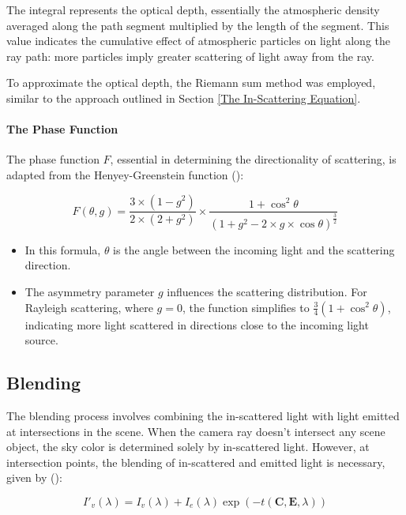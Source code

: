 The integral represents the optical depth, essentially the atmospheric density averaged along the path segment multiplied by the length of the segment. This value indicates the cumulative effect of atmospheric particles on light along the ray path: more particles imply greater scattering of light away from the ray.

To approximate the optical depth, the Riemann sum method was employed, similar to the approach outlined in Section \ref{The In-Scattering Equation}.

\paragraph{The Phase Function}

The phase function $F$, essential in determining the directionality of scattering, is adapted from the Henyey-Greenstein function ():

\begin{equation}
    F(\theta, g) = \frac{3 \times (1 - g^2)}{2 \times (2 + g^2)} \times \frac{1 + \cos^2 \theta}{(1 + g^2 - 2 \times g \times \cos \theta)^{\frac{3}{2}}}
\end{equation}

\begin{itemize}
    \item In this formula, $\theta$ is the angle between the incoming light and the scattering direction.
    \item The asymmetry parameter $g$ influences the scattering distribution. For Rayleigh scattering, where $g = 0$, the function simplifies to $\frac{3}{4}(1 + \cos^2\theta)$, indicating more light scattered in directions close to the incoming light source.
\end{itemize}

\subsection{Blending}

The blending process involves combining the in-scattered light with light emitted at intersections in the scene. When the camera ray doesn't intersect any scene object, the sky color is determined solely by in-scattered light. However, at intersection points, the blending of in-scattered and emitted light is necessary, given by ():

\begin{equation}
    I'_v(\lambda) = I_v(\lambda) + I_e(\lambda)\exp(-t(\mathbf{C}, \mathbf{E}, \lambda))
\end{equation}

